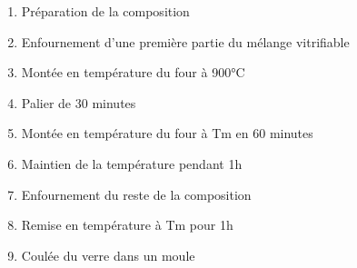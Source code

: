 \documentclass{article}
\begin{document}
\begin{enumerate}
    \item Préparation de la composition
    \item Enfournement d'une première partie du mélange vitrifiable
    \item Montée en température du four à 900°C
    \item Palier de 30 minutes
    \item Montée en température du four à Tm en 60 minutes
    \item Maintien de la température pendant 1h
    \item Enfournement du reste de la composition
    \item Remise en température à Tm pour 1h
    \item Coulée du verre dans un moule
\end{enumerate}
\end{document}
